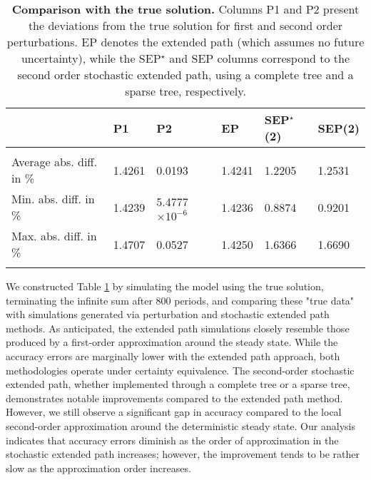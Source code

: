 \documentclass[a4paper,12pt]{amsart}
\begin{document}
\begin{table}[H]
   \centering
   \begin{tabular}{l l l l l l }
      \hline
                               & P1     & P2                     & EP     & SEP$^{\star}$(2) & SEP(2) \\
      \hline\hline
      \\[-1em]
      Average abs. diff. in \% & 1.4261 & 0.0193                 & 1.4241 & 1.2205           & 1.2531 \\
      Min. abs. diff.  in \%   & 1.4239 & 5.4777$\times 10^{-6}$ & 1.4236 & 0.8874           & 0.9201 \\
      Max. abs. diff.  in \%   & 1.4707 & 0.0527                 & 1.4250 & 1.6366           & 1.6690 \\ [1ex]
      \hline
      \\ [.25em]
   \end{tabular}
   \caption{\textbf{Comparison with the true solution.} Columns P1 and
      P2 present the deviations from the true solution for first and
      second order perturbations. EP denotes the extended path (which
      assumes no future uncertainty), while the SEP$^{\star}$ and SEP
      columns correspond to the second order stochastic extended path,
      using a complete tree and a sparse tree, respectively.}
   \label{table:1}
\end{table}


We constructed Table \ref{table:1} by simulating the model using the
true solution, terminating the infinite sum after 800 periods, and
comparing these "true data" with simulations generated via
perturbation and stochastic extended path methods. As anticipated, the
extended path simulations closely resemble those produced by a
first-order approximation around the steady state. While the accuracy
errors are marginally lower with the extended path approach, both
methodologies operate under certainty equivalence. The second-order
stochastic extended path, whether implemented through a complete tree
or a sparse tree, demonstrates notable improvements compared to the
extended path method. However, we still observe a significant gap in
accuracy compared to the local second-order approximation around the
deterministic steady state. Our analysis indicates that accuracy
errors diminish as the order of approximation in the stochastic
extended path increases; however, the improvement tends to be rather
slow as the approximation order increases.\newline
\end{document}
